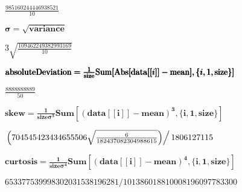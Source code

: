 \documentclass{article}
\begin{document}
\noindent\(\frac{985160244446938521}{10}\)

\noindent\(\pmb{\sigma =\sqrt{\text{variance}}}\)

\noindent\(3 \sqrt{\frac{109462249382993169}{10}}\)

\noindent\(\pmb{\text{absoluteDeviation}=}\\
\pmb{\frac{1}{\text{size}}\text{Sum}[\text{Abs}[\text{data}[[i]]-\text{mean}],\{i,1,\text{size}\}]}\)

\noindent\(\frac{8888888889}{50}\)

\noindent\(\pmb{\text{skew}=\frac{1}{\text{size} \sigma ^3}\text{Sum}\left[(\text{data}[[i]]-\text{mean})^3,\{i,1,\text{size}\}\right]}\)

\noindent\(\left.\left(704545423434655506 \sqrt{\frac{6}{182437082304988615}}\right)\right/1806127115\)

\noindent\(\pmb{\text{curtosis}=\frac{1}{\text{size} \sigma ^4}\text{Sum}\left[(\text{data}[[i]]-\text{mean})^4,\{i,1,\text{size}\}\right]}\)

\noindent\(653377539998302031538196281/101386018810008196097783300\)
\end{document}
